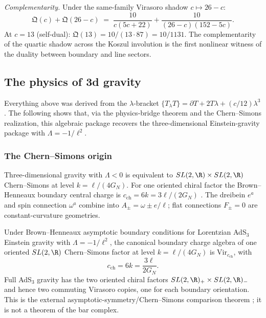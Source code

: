 \begin{computation}
\emph{Complementarity.} Under the same-family Virasoro shadow
$c \mapsto 26 - c$:
\[
\mathfrak{Q}(c) + \mathfrak{Q}(26-c)
\;=\;
\frac{10}{c(5c+22)} + \frac{10}{(26-c)(152-5c)}.
\]
At $c = 13$ (self-dual): $\mathfrak{Q}(13) = 10/(13 \cdot 87) =
10/1131$. The complementarity of the quartic shadow across the
Koszul involution is
the first nonlinear witness of the duality between boundary and
line sectors.
\end{computation}


\subsection{The physics of 3d gravity}
\label{subsec:gravity-physics}

Everything above was derived from the $\lambda$-bracket
$\{T_\lambda T\} = \partial T + 2T\lambda + (c/12)\lambda^3$.
The following shows that, via the physics-bridge theorem and the
Chern--Simons realization, this algebraic package recovers the
three-dimensional Einstein-gravity package with
$\Lambda = -1/\ell^2$.

\subsubsection*{The Chern--Simons origin}

Three-dimensional gravity with $\Lambda < 0$ is equivalent to
$SL(2,\R) \times SL(2,\R)$ Chern--Simons at level
$k = \ell/(4G_N)$.  For one oriented chiral factor the
Brown--Henneaux boundary central charge is
$c_{\mathrm{ch}} = 6k = 3\ell/(2G_N)$
\cite{BrownHenneaux,Witten88}. The dreibein $e^a$ and spin
connection $\omega^a$ combine into $A_\pm = \omega \pm e/\ell$;
flat connections $F_\pm = 0$ are constant-curvature geometries.

\begin{theorem}
\label{thm:brown-henneaux}
Under Brown--Henneaux asymptotic boundary conditions for Lorentzian
AdS$_3$ Einstein gravity with \(\Lambda=-1/\ell^2\), the canonical
boundary charge algebra of one oriented $SL(2,\R)$ Chern--Simons
factor at level \(k=\ell/(4G_N)\) is
\(\mathrm{Vir}_{c_{\mathrm{ch}}}\), with
\[
c_{\mathrm{ch}} = 6k = \frac{3\ell}{2G_N}.
\]
Full AdS$_3$ gravity has the two oriented chiral factors
$SL(2,\R)_+\times SL(2,\R)_-$ and hence two commuting Virasoro
copies, one for each boundary orientation.  This is the external
asymptotic-symmetry/Chern--Simons comparison theorem
\cite{BrownHenneaux,Witten88}; it is not a theorem of the bar complex.
\end{theorem}

